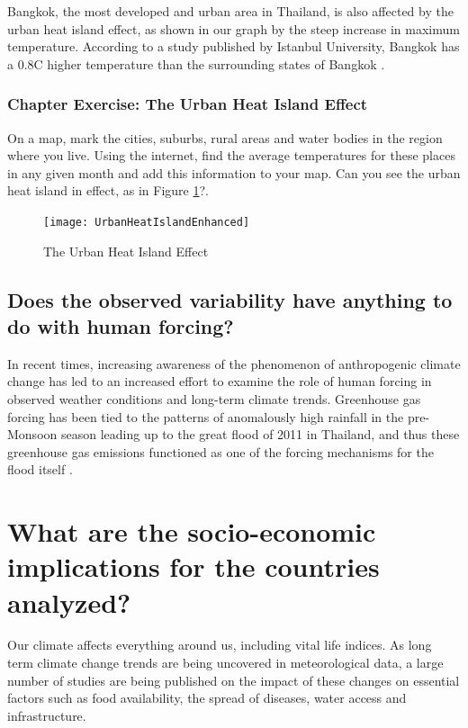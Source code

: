 Bangkok, the most developed and urban area in Thailand, is also affected by the urban heat island effect, as shown in our graph by the steep increase in maximum temperature. According to a study published by Istanbul University, Bangkok has  a 0.8\degree C higher temperature than the surrounding states of Bangkok \citep{bkkweather}. 

\subsubsection{Chapter Exercise: The Urban Heat Island Effect}

On a map, mark the cities, suburbs, rural areas and water bodies in the region where you live. Using the internet, find the average temperatures for these places in any given month and add this information to your map. Can you see the urban heat island in effect, as in Figure \ref{fig:urbanheat}?.

\begin{figure}[h!]
  \texttt{[image: UrbanHeatIslandEnhanced]}
  \caption{The Urban Heat Island Effect}
  \label{fig:urbanheat}
\end{figure}

\subsection{Does the observed variability have anything to do with human forcing?}

In recent times, increasing awareness of the phenomenon of anthropogenic climate change has led to an increased effort to examine the role of human forcing in observed weather conditions and long-term climate trends. Greenhouse gas forcing has been tied to the patterns of anomalously high rainfall in the pre-Monsoon season leading up to the great flood of 2011 in Thailand, and thus these greenhouse gas emissions functioned as one of the forcing mechanisms for the flood itself \citep{floodfailure}. 

\section{What are the socio-economic implications for the countries analyzed?}

Our climate affects everything around us, including vital life indices. As long term climate change trends are being uncovered in meteorological data, a large number of studies are being published on the impact of these changes on essential factors such as food availability, the spread of diseases, water access and infrastructure. 

